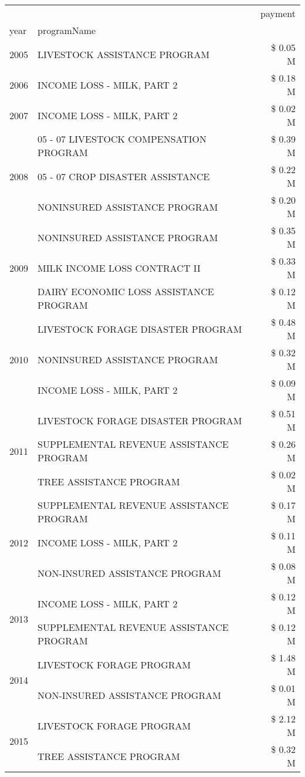 \begin{tabular}{llr}
\toprule
 &  & payment \\
year & programName &  \\
\midrule
2005 & LIVESTOCK ASSISTANCE PROGRAM & \$ 0.05 M \\
\cline{1-3}
2006 & INCOME LOSS - MILK, PART 2 & \$ 0.18 M \\
\cline{1-3}
2007 & INCOME LOSS - MILK, PART 2 & \$ 0.02 M \\
\cline{1-3}
\multirow[t]{3}{*}{2008} & 05 - 07 LIVESTOCK COMPENSATION PROGRAM & \$ 0.39 M \\
 & 05 - 07 CROP DISASTER ASSISTANCE & \$ 0.22 M \\
 & NONINSURED ASSISTANCE PROGRAM & \$ 0.20 M \\
\cline{1-3}
\multirow[t]{3}{*}{2009} & NONINSURED ASSISTANCE PROGRAM & \$ 0.35 M \\
 & MILK INCOME LOSS CONTRACT II & \$ 0.33 M \\
 & DAIRY ECONOMIC LOSS ASSISTANCE PROGRAM & \$ 0.12 M \\
\cline{1-3}
\multirow[t]{3}{*}{2010} & LIVESTOCK FORAGE DISASTER PROGRAM & \$ 0.48 M \\
 & NONINSURED ASSISTANCE PROGRAM & \$ 0.32 M \\
 & INCOME LOSS - MILK, PART 2 & \$ 0.09 M \\
\cline{1-3}
\multirow[t]{3}{*}{2011} & LIVESTOCK FORAGE DISASTER PROGRAM & \$ 0.51 M \\
 & SUPPLEMENTAL REVENUE ASSISTANCE PROGRAM & \$ 0.26 M \\
 & TREE ASSISTANCE PROGRAM & \$ 0.02 M \\
\cline{1-3}
\multirow[t]{3}{*}{2012} & SUPPLEMENTAL REVENUE ASSISTANCE PROGRAM & \$ 0.17 M \\
 & INCOME LOSS - MILK, PART 2 & \$ 0.11 M \\
 & NON-INSURED ASSISTANCE PROGRAM & \$ 0.08 M \\
\cline{1-3}
\multirow[t]{2}{*}{2013} & INCOME LOSS - MILK, PART 2 & \$ 0.12 M \\
 & SUPPLEMENTAL REVENUE ASSISTANCE PROGRAM & \$ 0.12 M \\
\cline{1-3}
\multirow[t]{2}{*}{2014} & LIVESTOCK FORAGE PROGRAM & \$ 1.48 M \\
 & NON-INSURED ASSISTANCE PROGRAM & \$ 0.01 M \\
\cline{1-3}
\multirow[t]{2}{*}{2015} & LIVESTOCK FORAGE PROGRAM & \$ 2.12 M \\
 & TREE ASSISTANCE PROGRAM & \$ 0.32 M \\

\end{tabular}
